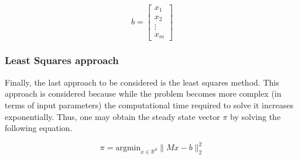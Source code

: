 \[
b = 
\begin{bmatrix}
    x_{1} \\
    x_{2} \\
    \vdots \\
    x_{m}
\end{bmatrix}
\]


\subsubsection{Least Squares approach}
Finally, the last approach to be considered is the least squares method. This approach is considered because while the problem becomes more complex (in terms of input parameters) the computational time required to solve it increases exponentially. Thus, one may obtain the steady state vector \( \pi \) by solving the following equation.

\[
\pi = \text{argmin}_{x\in\mathbb{R}^{d}}\|Mx-b\|_2^2
\]
